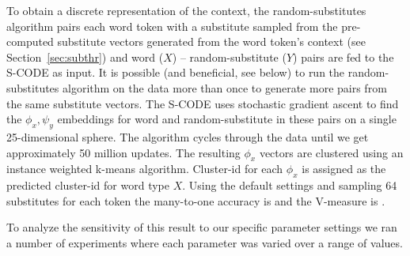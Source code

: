 To obtain a discrete representation of the context, the
random-substitutes algorithm pairs each word token with a substitute
sampled from the pre-computed substitute vectors generated from the
word token's context (see Section~\ref{sec:subthr}) and word ($X$) --
random-substitute ($Y$) pairs are fed to the S-CODE as input.  It is
possible (and beneficial, see below) to run the random-substitutes
algorithm on the data more than once to generate more pairs from the
same substitute vectors.  The S-CODE uses stochastic gradient ascent
to find the $\phi_x, \psi_y$ embeddings for word and random-substitute
in these pairs on a single 25-dimensional sphere.  The algorithm
cycles through the data until we get approximately 50 million updates.
The resulting $\phi_x$ vectors are clustered using an instance
weighted k-means algorithm.  Cluster-id for each $\phi_x$ is assigned
as the predicted cluster-id for word type $X$.  Using the default
settings and sampling 64 substitutes for each token the many-to-one
accuracy is \wsmto and the V-measure is \wsvm.


To analyze the sensitivity of this result to our specific parameter
settings we ran a number of experiments where each parameter was
varied over a range of values.


